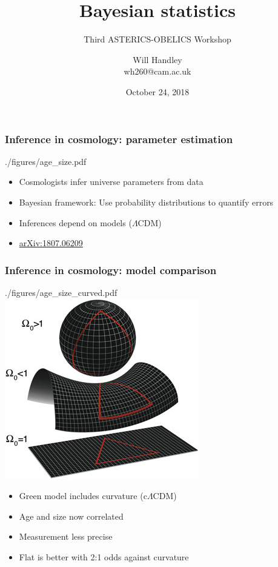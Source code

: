 \documentclass[%
]{beamer}
\title{Bayesian statistics}
\subtitle{Third ASTERICS-OBELICS Workshop}
\author[Handley] %
{Will Handley\\ \small{wh260@cam.ac.uk}}
\institute[University of Cambridge] %
{%
Kavli Institute for Cosmology\\
Cavendish Laboratory (Astrophysics Group) \\
University of Cambridge
}
\date{October 24, 2018}
\begin{document}
\begin{frame}
  \titlepage
\end{frame}

\begin{frame}
  \frametitle{Inference in cosmology: parameter estimation}
    \begin{figright}[0.4]{./figures/age_size.pdf}
        \begin{itemize}
            \item Cosmologists infer universe parameters from data
            \item Bayesian framework: Use probability distributions to quantify errors
            \item Inferences depend on models ($\Lambda$CDM)
            \item \href{https://arxiv.org/abs/1807.06209}{arXiv:1807.06209}
        \end{itemize}
    \end{figright}
\end{frame}

\begin{frame}
  \frametitle{Inference in cosmology: model comparison}
    \begin{figright}[0.4]{./figures/age_size_curved.pdf}
        \includegraphics[width=\textwidth]{./figures/shape-of-the-universe}
        \begin{itemize}
            \item Green model includes curvature (c$\Lambda$CDM)
            \item Age and size now correlated
            \item Measurement less precise
            \item Flat is better with 2:1 odds against curvature
        \end{itemize}
    \end{figright}
\end{frame}
\end{document}
